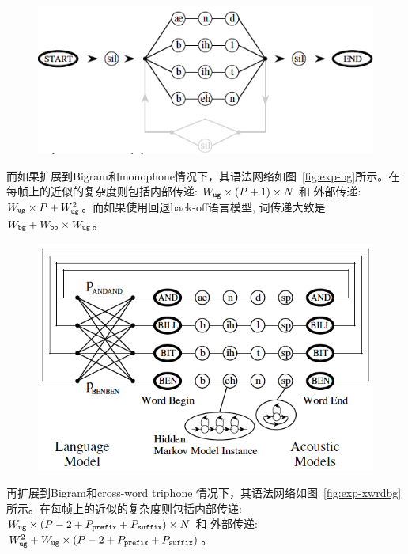 \begin{figure}[!htp]
  \centering
    \captionstyle{\centering}
    \includegraphics[clip=true, width=\textwidth]{figure/ug.png}
\end{figure}

而如果扩展到Bigram和monophone情况下，其语法网络如图~\ref{fig:exp-bg}所示。在每帧上的近似的复杂度则包括内部传递: $W_{\tt ug}\times (P+1)\times N$ 和 外部传递: $W_{\tt ug}\times P + W_{\tt ug}^2$。而如果使用回退back-off语言模型, 词传递大致是 $W_{\tt bg}+W_{\tt bo}\times W_{\tt ug}$。

\begin{figure}[!htp]
  \centering
    \captionstyle{\centering}
    \includegraphics[clip=true, width=\textwidth]{figure/bg.png}
\end{figure}


再扩展到Bigram和cross-word triphone 情况下，其语法网络如图~\ref{fig:exp-xwrdbg}所示。在每帧上的近似的复杂度则包括内部传递: $W_{\tt ug}\times (P-2+ P_{\tt prefix}+ P_{\tt suffix})\times N$ 和 外部传递: $W_{\tt ug}^2 + W_{\tt ug}\times (P-2+ P_{\tt prefix}+ P_{\tt suffix})$。

